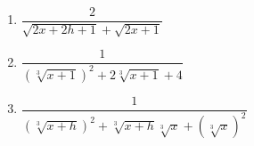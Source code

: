 \documentclass[11pt]{article}
\theoremstyle{definition}  %
\newcounter{HW}
\begin{document}
\enlargethispage{1in}

\begin{multicols}{3}
\begin{enumerate}
\setcounter{enumi}{\value{HW}}


\item  $\dfrac{2}{\sqrt{2x+2h+1} + \sqrt{2x+1}}$                                  

\item  $\dfrac{1}{(\sqrt[3]{x+1})^2 + 2\sqrt[3]{x+1} + 4}$                                    

\item  $\dfrac{1}{(\sqrt[3]{x+h})^2 + \sqrt[3]{x+h}\sqrt[3]{x} + (\sqrt[3]{x})^2}$

\setcounter{HW}{\value{enumi}}
\end{enumerate}
\end{multicols}
\end{document}
